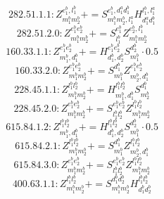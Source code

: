 \documentclass[letterpaper,10pt,fleqn,leqno,onecolumn]{article}
\begin{document}
\begin{equation} \;\;\;\;\;\;  282.51.1.1: Z^{e_{1}^{b},l_{1}^{b}}_{m_{1}^{b}m_{2}^{b}}+=S^{e_{1}^{b},d_{1}^{a}d_{1}^{b}}_{m_{1}^{b}m_{2}^{b},l_{1}^{a}}H^{l_{1}^{b},l_{1}^{a}}_{d_{1}^{a}d_{1}^{b}} \end{equation}
\begin{equation} \;\;\;\;\;\;  282.51.2.0: Z^{e_{1}^{b}e_{2}^{b}}_{m_{1}^{b}m_{2}^{b}}+=S^{e_{1}^{b}}_{l_{1}^{b}}Z^{e_{2}^{b},l_{1}^{b}}_{m_{1}^{b}m_{2}^{b}} \end{equation}
\begin{equation} \;\;\;\;\;\;  160.33.1.1: Z^{e_{1}^{b}e_{2}^{b}}_{m_{1}^{b},d_{1}^{b}}+=H^{e_{1}^{b}e_{2}^{b}}_{d_{1}^{b},d_{2}^{b}}S^{d_{2}^{b}}_{m_{1}^{b}}\cdot 0.5 \end{equation}
\begin{equation} \;\;\;\;\;\;  160.33.2.0: Z^{e_{1}^{b}e_{2}^{b}}_{m_{1}^{b}m_{2}^{b}}+=S^{d_{1}^{b}}_{m_{1}^{b}}Z^{e_{1}^{b}e_{2}^{b}}_{m_{2}^{b},d_{1}^{b}} \end{equation}
\begin{equation} \;\;\;\;\;\;  228.45.1.1: Z^{l_{1}^{b}l_{2}^{b}}_{m_{1}^{b}m_{2}^{b}}+=H^{l_{1}^{b}l_{2}^{b}}_{m_{1}^{b},d_{1}^{b}}S^{d_{1}^{b}}_{m_{2}^{b}} \end{equation}
\begin{equation} \;\;\;\;\;\;  228.45.2.0: Z^{e_{1}^{b}e_{2}^{b}}_{m_{1}^{b}m_{2}^{b}}+=S^{e_{1}^{b}e_{2}^{b}}_{l_{1}^{b}l_{2}^{b}}Z^{l_{1}^{b}l_{2}^{b}}_{m_{1}^{b}m_{2}^{b}} \end{equation}
\begin{equation} \;\;\;\;\;\;  615.84.1.2: Z^{l_{1}^{b}l_{2}^{b}}_{m_{1}^{b},d_{1}^{b}}+=H^{l_{1}^{b}l_{2}^{b}}_{d_{1}^{b},d_{2}^{b}}S^{d_{2}^{b}}_{m_{1}^{b}}\cdot 0.5 \end{equation}
\begin{equation} \;\;\;\;\;\;  615.84.2.1: Z^{l_{1}^{b}l_{2}^{b}}_{m_{1}^{b}m_{2}^{b}}+=S^{d_{1}^{b}}_{m_{1}^{b}}Z^{l_{1}^{b}l_{2}^{b}}_{m_{2}^{b},d_{1}^{b}} \end{equation}
\begin{equation} \;\;\;\;\;\;  615.84.3.0: Z^{e_{1}^{b}e_{2}^{b}}_{m_{1}^{b}m_{2}^{b}}+=S^{e_{1}^{b}e_{2}^{b}}_{l_{1}^{b}l_{2}^{b}}Z^{l_{1}^{b}l_{2}^{b}}_{m_{1}^{b}m_{2}^{b}} \end{equation}
\begin{equation} \;\;\;\;\;\;  400.63.1.1: Z^{l_{1}^{b}l_{2}^{b}}_{m_{1}^{b}m_{2}^{b}}+=S^{d_{1}^{b}d_{2}^{b}}_{m_{1}^{b}m_{2}^{b}}H^{l_{1}^{b}l_{2}^{b}}_{d_{1}^{b}d_{2}^{b}} \end{equation}
\end{document}
